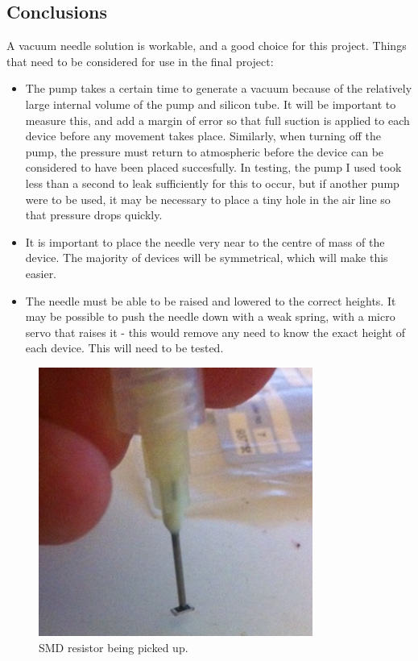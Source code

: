 \documentclass[a4paper,11pt]{article}  %
\begin{document}
\subsection{Conclusions}
A vacuum needle solution is workable, and a good choice for this project. Things that need to be considered for use in the final project:

\begin{itemize}
	\item	The pump takes a certain time to generate a vacuum because of the relatively large internal volume of the pump
		and silicon tube. It will be important to measure this, and add a margin of error so that full suction is applied
		to each device before any movement takes place. Similarly, when turning off the pump, the pressure must return to
		atmospheric before the device can be considered to have been placed succesfully. In testing, the pump I used took
		less than a second to leak sufficiently for this to occur, but if another pump were to be used, it may be necessary
		to place a tiny hole in the air line so that pressure drops quickly.
	\item	It is important to place the needle very near to the centre of mass of the device. The majority of devices will be
		symmetrical, which will make this easier.
	\item	The needle must be able to be raised and lowered to the correct heights. It may be possible to push the needle down
		with a weak spring, with a micro servo that raises it - this would remove any need to know the exact height of each
		device. This will need to be tested.
\end{itemize}

\begin{figure}[ht!]
\centering
\includegraphics[width=90mm]{resources/needle_with_resistor.jpg}
\caption{SMD resistor being picked up.}
\label{overflow}
\end{figure}
\end{document}
